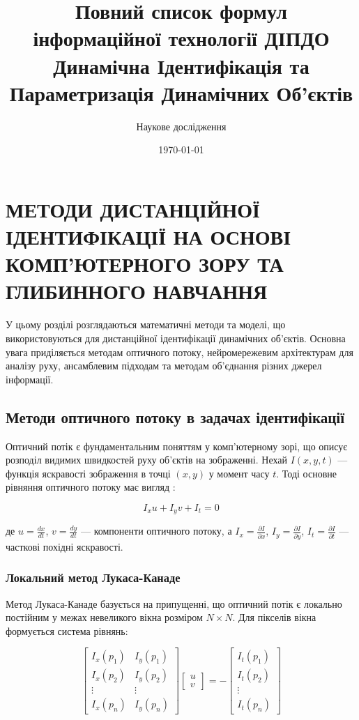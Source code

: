 \documentclass[14pt, a4paper]{extarticle}
\title{Повний список формул\\інформаційної технології ДІПДО\\
\large{Динамічна Ідентифікація та Параметризація Динамічних Об'єктів}}
\author{Наукове дослідження}
\date{\today}
\numberwithin{equation}{section}
\begin{document}
\section{МЕТОДИ ДИСТАНЦІЙНОЇ ІДЕНТИФІКАЦІЇ НА ОСНОВІ КОМП'ЮТЕРНОГО ЗОРУ ТА ГЛИБИННОГО НАВЧАННЯ}

У цьому розділі розглядаються математичні методи та моделі, що використовуються для дистанційної ідентифікації динамічних об'єктів. Основна увага приділяється методам оптичного потоку, нейромережевим архітектурам для аналізу руху, ансамблевим підходам та методам об'єднання різних джерел інформації.

\subsection{Методи оптичного потоку в задачах ідентифікації}

Оптичний потік є фундаментальним поняттям у комп'ютерному зорі, що описує розподіл видимих швидкостей руху об'єктів на зображенні. Нехай $I(x,y,t)$ — функція яскравості зображення в точці $(x,y)$ у момент часу $t$. Тоді основне рівняння оптичного потоку має вигляд \cite{horn1981determining}:

\begin{equation}
I_x u + I_y v + I_t = 0 \tag{8}
\end{equation}

де $u = \frac{dx}{dt}$, $v = \frac{dy}{dt}$ — компоненти оптичного потоку, а $I_x = \frac{\partial I}{\partial x}$, $I_y = \frac{\partial I}{\partial y}$, $I_t = \frac{\partial I}{\partial t}$ — часткові похідні яскравості.

\subsubsection{Локальний метод Лукаса-Канаде}

Метод Лукаса-Канаде \cite{lucas1981iterative} базується на припущенні, що оптичний потік є локально постійним у межах невеликого вікна розміром $N \times N$. Для пікселів вікна формується система рівнянь:

\begin{equation}
\begin{bmatrix} 
I_x(p_1) & I_y(p_1) \\ 
I_x(p_2) & I_y(p_2) \\ 
\vdots & \vdots \\ 
I_x(p_n) & I_y(p_n) 
\end{bmatrix} 
\begin{bmatrix} u \\ v \end{bmatrix} = 
-\begin{bmatrix} I_t(p_1) \\ I_t(p_2) \\ \vdots \\ I_t(p_n) \end{bmatrix} \tag{9}
\end{equation}
\end{document}

